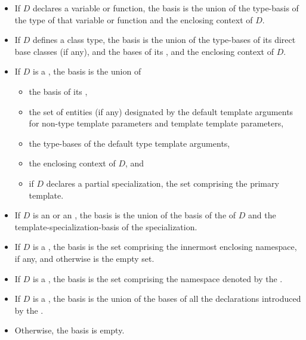 \begin{std.txt}
\begin{itemize}
\item If $D$ declares a variable or function,
the basis is the union of
the type-basis of the type of that variable or function
and the enclosing context of $D$.

\item If $D$ defines a class type, the basis is the union of the
type-bases of its direct base classes (if any), and the bases of
its ,
and the enclosing context of $D$.

\item If $D$ is a ,
the basis is the union
of
\begin{itemize}
\item
the basis of its ,
\item
the set of entities (if any) designated by
the default template arguments for
non-type template parameters and template template parameters,
\item
the type-bases of the default type template arguments,
\item
the enclosing context of $D$, and
\item
if $D$ declares a partial specialization,
the set comprising the primary template.
\end{itemize}

\item If $D$ is an 
or an , the basis is the union of
the basis of the  of $D$ and
the template-specialization-basis of the specialization.

\item If $D$ is a , the basis is
the set comprising the innermost enclosing namespace, if any,
and otherwise is the empty set.

\item If $D$ is a , the basis is
the set comprising the namespace denoted by the
.

\item If $D$ is a , the basis is the union
of the bases of all the declarations introduced by
the .

\item Otherwise, the basis is empty.
\end{itemize}


\end{std.txt}
